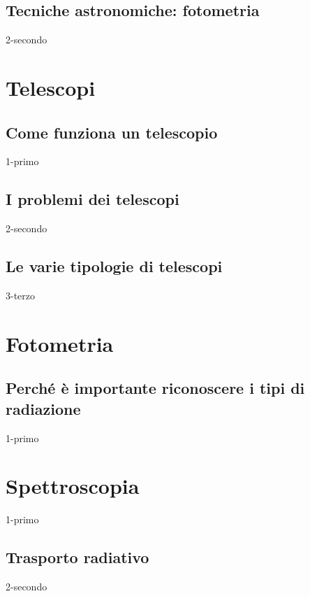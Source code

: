 \documentclass[openany,12pt]{article}
\begin{document}
  \subsection{Tecniche astronomiche: fotometria}
  {2-secondo}

\newpage

\section{Telescopi}

  \subsection{Come funziona un telescopio}
  {1-primo}

  \subsection{I problemi dei telescopi}
  {2-secondo}

  \subsection{Le varie tipologie di telescopi}
  {3-terzo}

\newpage

\section{Fotometria}

  \subsection{Perché è importante riconoscere i tipi di radiazione}
  {1-primo}

\newpage

\section{Spettroscopia}
  {1-primo}

  \subsection{Trasporto radiativo}
  {2-secondo}
\end{document}
